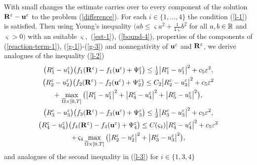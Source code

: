 \documentclass[reqno]{amsart}            %
\numberwithin{equation}{section}
\begin{document}
With small changes the estimate carries over to every component of the solution ${\bf R}^\varepsilon - {\bf u}^\varepsilon$ to the problem (\ref{difference}).
For each $i\in \{1,\ldots,4\}$ the condition (\ref{l-1}) is satisfied. Then using  Young's inequality $(ab \le \varsigma a^2 + \tfrac{1}{4\varsigma}b^2$ for all $a, b \in \Bbb R$ and $\varsigma>0)$ with an suitable $\varsigma,$ (\ref{est-1}), (\ref{bound-4}),  properties of the components of (\ref{reaction-term-1}), (\ref{g-1})-(\ref{g-3})
and nonnegativity of ${\bf u}^\varepsilon$ and ${\bf R}^\varepsilon$,
we derive  analogues of the inequality (\ref{l-2})
\begin{gather}\label{in-10}
\big(R^\varepsilon_1 -  u^\varepsilon_1 \big) \big(f_1({\bf R}^\varepsilon) - f_1({\bf u}^\varepsilon) + \Psi^\varepsilon_1\big) \le \tfrac12 \big|R^\varepsilon_1 -  u^\varepsilon_1 \big|^2 + c_5 \varepsilon^2,
\\
\big(R^\varepsilon_2 -  u^\varepsilon_2 \big) \big(f_2({\bf R}^\varepsilon) - f_2({\bf u}^\varepsilon) + \Psi^\varepsilon_2\big) \le
C_2 \big|R^\varepsilon_2 -  u^\varepsilon_2 \big|^2 + c_5 \varepsilon^2 \notag
\\
 + \, \max_{\overline{\Omega}\times [0,T]}\big(\big|R^\varepsilon_1 -  u^\varepsilon_1 \big|^2+ \big|R^\varepsilon_4 -  u^\varepsilon_4 \big|^2 + \big|R^\varepsilon_5 -  u^\varepsilon_5 \big|^2 \big),
 \\
\big(R^\varepsilon_3 -  u^\varepsilon_3 \big) \big(f_3({\bf R}^\varepsilon) - f_3({\bf u}^\varepsilon) + \Psi^\varepsilon_3\big) \le
\tfrac12 \big|R^\varepsilon_3 -  u^\varepsilon_3 \big|^2 + c_5 \varepsilon^2,
\\
\big(R^\varepsilon_4 -  u^\varepsilon_4 \big) \big(f_4({\bf R}^\varepsilon) - f_4({\bf u}^\varepsilon) + \Psi^\varepsilon_4\big) \le
C(\varsigma_4)\big|R^\varepsilon_4 -  u^\varepsilon_4 \big|^2 + c_5 \varepsilon^2 \notag
\\
 + \, \varsigma_4\max_{\overline{\Omega}\times [0,T]}\big(\big|R^\varepsilon_2 -  u^\varepsilon_2 \big|^2 + \big|R^\varepsilon_3 -  u^\varepsilon_3 \big|^2 \big),
\end{gather}
and analogues of the second inequality in (\ref{l-3}) for $i\in\{1,3,4\}$
\end{document}
